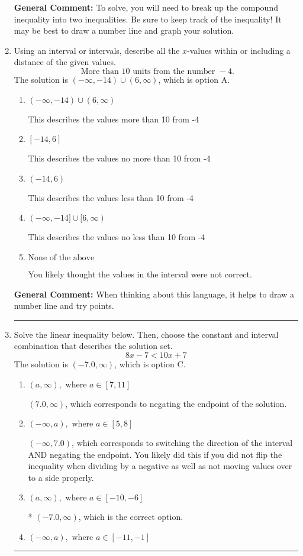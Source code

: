 \documentclass{extbook}[14pt]
\newcommand{\litem}[1]{\item #1

\rule{\textwidth}{0.4pt}}
\begin{document}
\begin{enumerate}
{\textbf{General Comment:} To solve, you will need to break up the compound inequality into two inequalities. Be sure to keep track of the inequality! It may be best to draw a number line and graph your solution.
}
\litem{
Using an interval or intervals, describe all the $x$-values within or including a distance of the given values.
\[ \text{ More than } 10 \text{ units from the number } -4. \]The solution is \( (-\infty, -14) \cup (6, \infty) \), which is option A.\begin{enumerate}[label=\Alph*.]
\item \( (-\infty, -14) \cup (6, \infty) \)

This describes the values more than 10 from -4
\item \( [-14, 6] \)

This describes the values no more than 10 from -4
\item \( (-14, 6) \)

This describes the values less than 10 from -4
\item \( (-\infty, -14] \cup [6, \infty) \)

This describes the values no less than 10 from -4
\item \( \text{None of the above} \)

You likely thought the values in the interval were not correct.
\end{enumerate}

\textbf{General Comment:} When thinking about this language, it helps to draw a number line and try points.
}
\litem{
Solve the linear inequality below. Then, choose the constant and interval combination that describes the solution set.
\[ 8x -7 < 10x + 7 \]The solution is \( (-7.0, \infty) \), which is option C.\begin{enumerate}[label=\Alph*.]
\item \( (a, \infty), \text{ where } a \in [7, 11] \)

 $(7.0, \infty)$, which corresponds to negating the endpoint of the solution.
\item \( (-\infty, a), \text{ where } a \in [5, 8] \)

 $(-\infty, 7.0)$, which corresponds to switching the direction of the interval AND negating the endpoint. You likely did this if you did not flip the inequality when dividing by a negative as well as not moving values over to a side properly.
\item \( (a, \infty), \text{ where } a \in [-10, -6] \)

* $(-7.0, \infty)$, which is the correct option.
\item \( (-\infty, a), \text{ where } a \in [-11, -1] \)


\end{enumerate}}
\end{enumerate}
\end{document}
